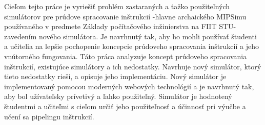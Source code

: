\bigskip{}

Cieľom tejto práce je vyriešiť problém zastaraných a ťažko použiteľných simulátorov pre prúdove spracovanie inštrukcií -hlavne archaického MIPSimu používaného v predmete Základy počítačového inžinierstva na FIIT STU- zavedením nového simulátora. Je navrhnutý tak, aby ho mohli používať študenti a učitelia na lepšie pochopenie koncepcie prúdoveho spracovania inštrukcií a jeho vnútorného fungovania. Táto práca analyzuje koncept prúdoveho spracovania inštrukcií, existujúce simulátory a ich nedostatky. Navrhuje nový simulátor, ktorý tieto nedostatky rieši, a opisuje jeho implementáciu. Nový simulátor je implementovaný pomocou moderných webových technológií a je navrhnutý tak, aby bol užívateľsky prívetivý a ľahko použiteľný. Simulátor je hodnotený študentmi a učiteľmi s cieľom určiť jeho použiteľnosť a účinnosť pri výučbe a učení sa pipelingu inštrukcií.

\newpage{}\thispagestyle{empty}\medskip{}


\newpage{}


\thispagestyle{empty}
\mbox{}
\newpage


